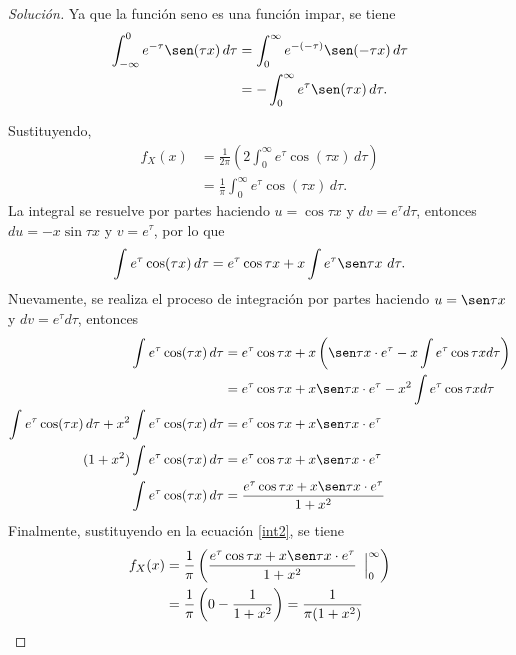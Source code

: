 \documentclass[12pt,letterpaper]{article}
\newcommand\integral[4]{\ensuremath{\int_{#1}^{#2} #3 \, d#4}}
\begin{document}
\begin{proof}[Solución]
Ya que la función seno es una función impar, se tiene
\begin{align}
\integral{-\infty}{0}{e^{-\tau}\sen(\tau x)}{\tau} & = \integral{0}{\infty}{e^{-(-\tau)}\sen(-\tau x)}{\tau} \\
&= -\integral{0}{\infty}{e^{\tau}\sen(\tau x)}{\tau}.
\end{align}

Sustituyendo, 
\begin{align}
f_{X}(x) &=\frac{1}{2\pi} \left(2 \integral{0}{\infty}{e^{\tau}\cos(\tau x)}{\tau}\right) \\
&= \frac{1}{\pi}  \integral{0}{\infty}{e^{\tau}\cos(\tau x)}{\tau}. \label{int2}
\end{align}
La integral se resuelve por partes haciendo $u=\cos \tau x$ y $dv = e^{\tau}d\tau$, entonces $du=-x\sin \tau x$ y $v=e^\tau$, por lo que 
\begin{align}
\integral{}{}{e^{\tau}\cos(\tau x)}{\tau} = e^\tau\cos \tau x + x \int e^\tau \sen \tau x \,\,d\tau. 
\end{align}
Nuevamente, se realiza el proceso de integración por partes haciendo $u=\sen \tau x$ y $dv = e^\tau d\tau$, entonces
\begin{align}
\integral{}{}{e^{\tau}\cos(\tau x)}{\tau} &= e^\tau\cos \tau x + x\left( \sen \tau x \cdot e^\tau - x \int e^\tau \cos \tau x d\tau \right) \\ &= e^\tau\cos \tau x + x \sen \tau x \cdot e^\tau - x^2 \int e^\tau \cos \tau x d\tau \\
\integral{}{}{e^{\tau}\cos(\tau x)}{\tau} + x^2 \integral{}{}{e^{\tau}\cos(\tau x)}{\tau} &= e^\tau\cos \tau x + x \sen \tau x \cdot e^\tau \\
(1+x^2)\integral{}{}{e^{\tau}\cos(\tau x)}{\tau} &= e^\tau\cos \tau x + x \sen \tau x \cdot e^\tau \\
\integral{}{}{e^{\tau}\cos(\tau x)}{\tau} &=\frac{e^\tau\cos \tau x + x \sen \tau x \cdot e^\tau}{1+x^2} \\
\end{align}
Finalmente, sustituyendo en la ecuación \ref{int2}, se tiene
\begin{align}
f_{X}(x) &= \frac{1}{\pi}  \left( \frac{e^\tau\cos \tau x + x \sen \tau x \cdot e^\tau}{1+x^2} \,\,\, \Big\lvert_{0}^{\infty} \right) \\ &=\frac{1}{\pi} \left( 0 - \frac{1}{1+x^2} \right) = \frac{1}{\pi(1+x^2)}
\end{align}
\end{proof}
\end{document}
